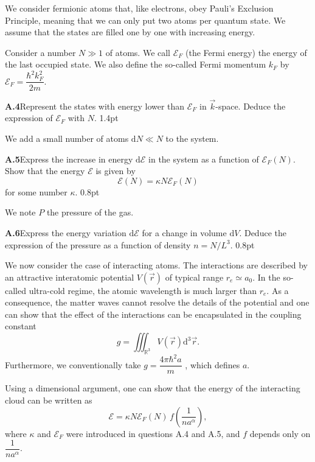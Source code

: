 We consider fermionic atoms that, like electrons, obey Pauli's Exclusion
Principle, meaning that we can only put two atoms per quantum state. We assume
that the states are filled one by one with increasing energy.

Consider a number $N \gg 1$ of atoms. We call $\mathcal{E}_F$ (the Fermi energy)
the energy of the last occupied state. We also define the so-called Fermi
momentum $k_F$ by $\mathcal{E}_F = \dfrac{\hbar^2 k_F^2}{2m}$.

\textbf{A.4}\quad Represent the states with energy lower than $\mathcal{E}_F$ in
$\overrightarrow{k}$-space. Deduce the expression of $\mathcal{E}_F$ with $N$.
\hfill 1.4pt

We add a small number of atoms $\mathrm{d}N \ll N$ to the system.

\textbf{A.5}\quad Express the increase in energy $\mathrm{d}\mathcal{E}$ in the
system as a function of $\mathcal{E}_F(N)$. Show that the energy $\mathcal{E}$
is given by
\begin{equation}
\mathcal{E}(N) = \kappa N \mathcal{E}_F(N) \tag{2}
\end{equation}
for some number $\kappa$. \hfill 0.8pt

We note $P$ the pressure of the gas.

\textbf{A.6}\quad Express the energy variation $\mathrm{d}\mathcal{E}$ for a
change in volume $\mathrm{d}V$. Deduce the expression of the pressure as a
function of density $n = N/L^3$. \hfill 0.8pt

We now consider the case of interacting atoms. The interactions are described
by an attractive interatomic potential $V(\overrightarrow{r})$ of typical range
$r_e \simeq a_0$. In the so-called ultra-cold regime, the atomic wavelength is
much larger than $r_e$. As a consequence, the matter waves cannot resolve the
details of the potential and one can show that the effect of the interactions
can be encapsulated in the coupling constant
\begin{equation}
g = \iiint_{\mathbb{R}^3} V\left(\overrightarrow{r}\right) \mathrm{d}^3\overrightarrow{r}. \tag{3}
\end{equation}
Furthermore, we conventionally take $g = \dfrac{4\pi\hbar^2 a}{m}$ , which
defines $a$.

Using a dimensional argument, one can show that the energy of the interacting
cloud can be written as
\begin{equation}
\mathcal{E} = \kappa N \mathcal{E}_F(N)\, f\left(\frac{1}{na^\alpha}\right), \tag{4}
\end{equation}
where $\kappa$ and $\mathcal{E}_F$ were introduced in questions A.4 and A.5, and
$f$ depends only on $\dfrac{1}{na^\alpha}$.

